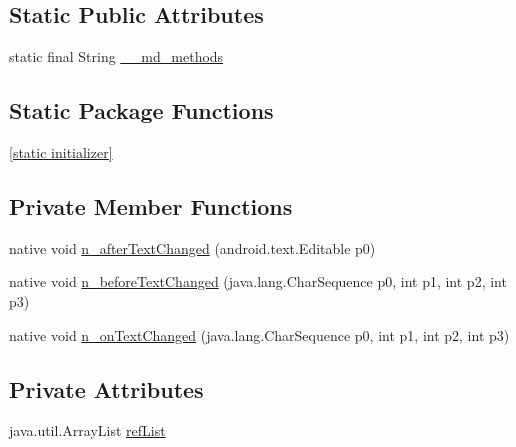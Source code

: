\subsection*{Static Public Attributes}
\begin{CompactItemize}
\item 
static final String \hyperlink{classmd5b60ffeb829f638581ab2bb9b1a7f4f3f_1_1_editor_renderer_05a5e2737d5175d2d79f153c42ba484d}{\_\-\_\-md\_\-methods}
\end{CompactItemize}
\subsection*{Static Package Functions}
\begin{CompactItemize}
\item 
\hyperlink{classmd5b60ffeb829f638581ab2bb9b1a7f4f3f_1_1_editor_renderer_baf0db3252461c188060b182e6b8fbb7}{\mbox{[}static initializer\mbox{]}}
\end{CompactItemize}
\subsection*{Private Member Functions}
\begin{CompactItemize}
\item 
native void \hyperlink{classmd5b60ffeb829f638581ab2bb9b1a7f4f3f_1_1_editor_renderer_6fa050a7e8b89d01fc6c51acafca5194}{n\_\-afterTextChanged} (android.text.Editable p0)
\item 
native void \hyperlink{classmd5b60ffeb829f638581ab2bb9b1a7f4f3f_1_1_editor_renderer_8db46b5036f8f8cc07e8ee41c77b8142}{n\_\-beforeTextChanged} (java.lang.CharSequence p0, int p1, int p2, int p3)
\item 
native void \hyperlink{classmd5b60ffeb829f638581ab2bb9b1a7f4f3f_1_1_editor_renderer_e07894d667938cbc7d7e06102fcf9f59}{n\_\-onTextChanged} (java.lang.CharSequence p0, int p1, int p2, int p3)
\end{CompactItemize}
\subsection*{Private Attributes}
\begin{CompactItemize}
\item 
java.util.ArrayList \hyperlink{classmd5b60ffeb829f638581ab2bb9b1a7f4f3f_1_1_editor_renderer_1cb544d5489e550f07655a227272eb99}{refList}
\end{CompactItemize}



